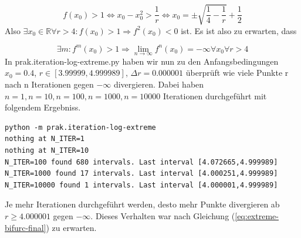 \documentclass{scrartcl}
\begin{document}
\begin{equation}
f(x_0) > 1 \iff x_0-x_0^2 > \frac{1}{r} \iff x_0 = \pm \sqrt{\frac{1}{4}-\frac{1}{r}} + \frac{1}{2}
\end{equation}
Also $\exists x_0 \in \mathbb{R} \forall r > 4: f(x_0) > 1 \Rightarrow f^2(x_0) < 0$ ist. Es ist also zu erwarten, dass 

\begin{equation}
\exists m : f^m(x_0) > 1 \Rightarrow
\lim_{n \rightarrow \infty} f^n(x_0) = -\infty \forall x_0 \forall r > 4
\label{eq:extreme-bifurc-final}
\end{equation}
In prak.iteration-log-extreme.py haben wir nun zu den Anfangsbedingungen $x_0=0.4$, $r \in [3.99999, 4.999989]$, $\Delta r = 0.000001$ überprüft wie viele Punkte r nach n Iterationen gegen $-\infty$ divergieren. Dabei haben $n=1, n=10, n=100, n=1000, n=10000$ Iterationen durchgeführt mit folgendem Ergebniss.

\begin{lstlisting}
python -m prak.iteration-log-extreme
nothing at N_ITER=1
nothing at N_ITER=10
N_ITER=100 found 680 intervals. Last interval [4.072665,4.999989]
N_ITER=1000 found 17 intervals. Last interval [4.000251,4.999989]
N_ITER=10000 found 1 intervals. Last interval [4.000001,4.999989]
\end{lstlisting}

Je mehr Iterationen durchgeführt werden, desto mehr Punkte divergieren ab $r \geq 4.000001$ gegen $-\infty$. Dieses Verhalten war nach Gleichung (\ref{eq:extreme-bifurc-final}) zu erwarten. 
\end{document}
